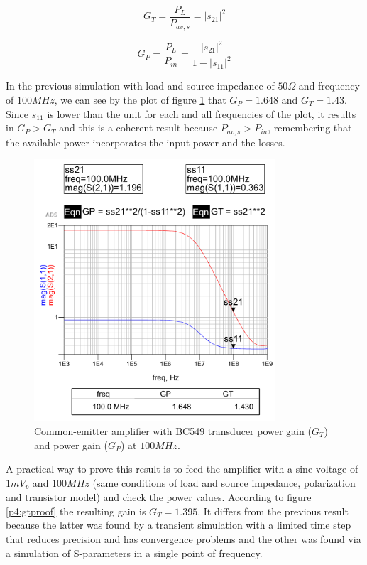 \begin{equation} \label{p4:gt}
    G_T = \frac{P_L}{P_{av,s}} = |s_{21}|^2
\end{equation}

\begin{equation} \label{p4:gp}
    G_P = \frac{P_L}{P_{in}} = \frac{|s_{21}|^2}{1 - |s_{11}|^2}
\end{equation}

In the previous simulation with load and source impedance of $50 \Omega$ and frequency of $100 MHz$, we can see by the plot of figure \ref{p4:gpgt} that $G_P = 1.648$ and $G_T = 1.43$. Since $s_{11}$ is lower than the unit for each and all frequencies of the plot, it results in $G_P > G_T$ and this is a coherent result because $P_{av,s} > P_{in}$, remembering that the available power incorporates the input power and the losses.


\begin{figure}[H] 
\centering
\includegraphics[width=9cm]{images/gpgt.png}
\caption{Common-emitter amplifier with BC549 transducer power gain ($G_T$) and power gain ($G_P$) at $100 MHz$.}
\label{p4:gpgt} 
\end{figure}

A practical way to prove this result is to feed the amplifier with a sine voltage of $1 mV_p$ and $100 MHz$ (same conditions of load and source impedance, polarization and transistor model) and check the power values. According to figure \ref{p4:gtproof} the resulting gain is $G_T = 1.395$. It differs from the previous result because the latter was found by a transient simulation with a limited time step that reduces precision and has convergence problems and the other was found via a simulation of S-parameters in a single point of frequency.

